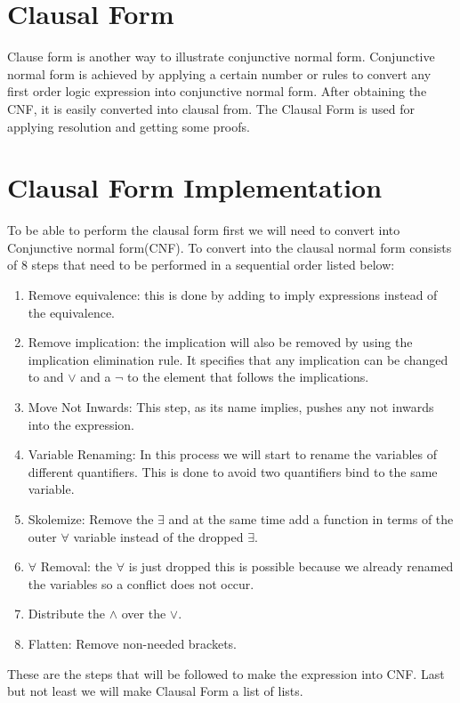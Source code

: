 {\section{Clausal Form}
Clause form is another way to illustrate conjunctive normal form. Conjunctive normal form is achieved by applying a certain number or rules to convert any first order logic expression into conjunctive normal form. After obtaining the CNF, it is easily converted into clausal from. The Clausal Form is used for applying resolution and getting some proofs.


\section{Clausal Form Implementation}
To be able to perform the clausal form first we will need to convert into Conjunctive normal form(CNF). To convert into the clausal normal form consists of 8 steps that need to be performed in a sequential order listed below:

\begin{enumerate}
\item{Remove equivalence: this is done by adding to imply expressions instead of the equivalence.}
\item{Remove implication: the implication will also be removed by using the implication elimination rule. It specifies that any implication can be changed to and $\vee$ and a $\neg$ to the element that follows the implications.}
\item{Move Not Inwards: This step, as its name implies, pushes any not inwards into the expression.}
\item{Variable Renaming: In this process we will start to rename the variables of different quantifiers. This is done to avoid two quantifiers bind to the same variable.}
\item{Skolemize: Remove the $\exists$ and at the same time add a function in terms of the outer $\forall$ variable instead of the dropped $\exists$.}
\item{$\forall$ Removal: the $\forall$ is just dropped this is possible because we already renamed the variables so a conflict does not occur.}
\item{Distribute the $\wedge$ over the $\vee$.}
\item{Flatten: Remove non-needed brackets.}
\end{enumerate}
These are the steps that will be followed to make the expression into CNF. Last but not least we will make Clausal Form a list of lists.
}
